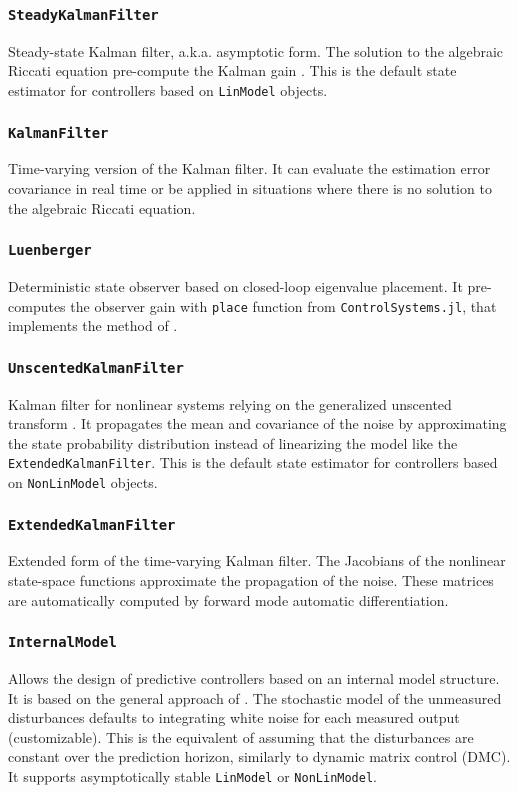 \subsubsection{\textnormal{\texttt{SteadyKalmanFilter}}}
Steady-state Kalman filter, a.k.a. asymptotic form. The solution to the algebraic Riccati equation pre-compute the Kalman gain \citep{kalmanBookSS}. This is the default state estimator for controllers based on \texttt{LinModel} objects.

\subsubsection{\textnormal{\texttt{KalmanFilter}}}
Time-varying version of the Kalman filter. It can evaluate the estimation error covariance in real time or be applied in situations where there is no solution to the algebraic Riccati equation.

\subsubsection{\textnormal{\texttt{Luenberger}}}
Deterministic state observer based on closed-loop eigenvalue placement. It pre-computes the observer gain with \texttt{place} function from \texttt{ControlSystems.jl}, that implements the method of \citet{placePoles}.

\subsubsection{\textnormal{\texttt{UnscentedKalmanFilter}}}
Kalman filter for nonlinear systems relying on the generalized unscented transform \citep{kalmanBook}. It propagates the mean and covariance of the noise by approximating the state probability distribution instead of linearizing the model like the \texttt{ExtendedKalmanFilter}. This is the default state estimator for controllers based on \texttt{NonLinModel} objects.

\subsubsection{\textnormal{\texttt{ExtendedKalmanFilter}}}
Extended form of the time-varying Kalman filter. The Jacobians of the nonlinear state-space functions approximate the propagation of the noise. These matrices are automatically computed by forward mode automatic differentiation.

\subsubsection{\textnormal{\texttt{InternalModel}}}
Allows the design of predictive controllers based on an internal model structure. It is based on the general approach of \citet{globPC}. The stochastic model of the unmeasured disturbances defaults to integrating white noise for each measured output (customizable). This is the equivalent of assuming that the disturbances are constant over the prediction horizon, similarly to dynamic matrix control (DMC). It supports asymptotically stable \texttt{LinModel} or \texttt{NonLinModel}.


